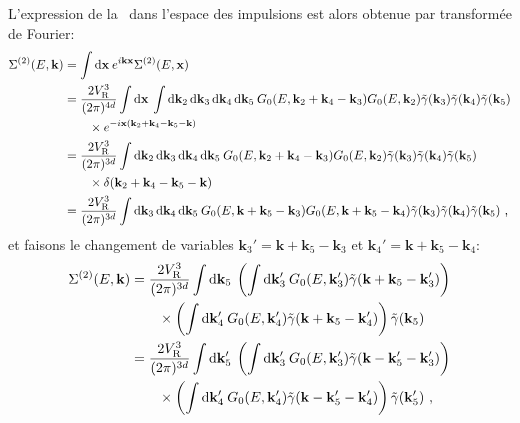 L'expression de la \selfenergy\ dans l'espace des impulsions est alors obtenue par transformée de Fourier: 
\begin{align}
\Sigma^{(2)}(E,\mathbf{k})&=\int{\mathop{}\mathopen{}\mathrm{d}\mathbf{x} \: e^{i \mathbf{k}\mathbf{x}} \Sigma^{(2)}(E,\mathbf{x})} \\
&=\nonumber \frac{2V_{\mathrm{R}}^3}{(2\pi)^{4d}} \int{\mathop{}\mathopen{}\mathrm{d}\mathbf{x} \: \int{\mathop{}\mathopen{}\mathrm{d}\mathbf{k}_{\mathrm{2}}\mathop{}\mathopen{}\mathrm{d}\mathbf{k}_{\mathrm{3}}\mathop{}\mathopen{}\mathrm{d}\mathbf{k}_{\mathrm{4}}\mathop{}\mathopen{}\mathrm{d}\mathbf{k}_{\mathrm{5}}\: G_0(E,\mathbf{k}_{\mathrm{2}}+\mathbf{k}_{\mathrm{4}}-\mathbf{k}_{\mathrm{3}}) G_0(E,\mathbf{k}_{\mathrm{2}})\tilde{\gamma}(\mathbf{k}_{\mathrm{3}})\tilde{\gamma}(\mathbf{k}_{\mathrm{4}})\tilde{\gamma}(\mathbf{k}_{\mathrm{5}})}} \\
& \qquad \times e^{-i \mathbf{x} (\mathbf{k}_{\mathrm{2}} + \mathbf{k}_{\mathrm{4}} - \mathbf{k}_{\mathrm{5}} - \mathbf{k})} \\
&=\nonumber \frac{2V_{\mathrm{R}}^3}{(2\pi)^{3d}} \int{\mathop{}\mathopen{}\mathrm{d}\mathbf{k}_{\mathrm{2}}\mathop{}\mathopen{}\mathrm{d}\mathbf{k}_{\mathrm{3}}\mathop{}\mathopen{}\mathrm{d}\mathbf{k}_{\mathrm{4}}\mathop{}\mathopen{}\mathrm{d}\mathbf{k}_{\mathrm{5}}\: G_0(E,\mathbf{k}_{\mathrm{2}}+\mathbf{k}_{\mathrm{4}}-\mathbf{k}_{\mathrm{3}}) G_0(E,\mathbf{k}_{\mathrm{2}})\tilde{\gamma}(\mathbf{k}_{\mathrm{3}})\tilde{\gamma}(\mathbf{k}_{\mathrm{4}})\tilde{\gamma}(\mathbf{k}_{\mathrm{5}})}\\
& \qquad \times\delta(\mathbf{k}_{\mathrm{2}} + \mathbf{k}_{\mathrm{4}} - \mathbf{k}_{\mathrm{5}} - \mathbf{k}) \\
&= \frac{2V_{\mathrm{R}}^3}{(2\pi)^{3d}} \int{\mathop{}\mathopen{}\mathrm{d}\mathbf{k}_{\mathrm{3}} \mathop{}\mathopen{}\mathrm{d}\mathbf{k}_{\mathrm{4}}\mathop{}\mathopen{}\mathrm{d}\mathbf{k}_{\mathrm{5}} \: G_0(E,\mathbf{k}+\mathbf{k}_{\mathrm{5}}-\mathbf{k}_{\mathrm{3}}) G_0(E,\mathbf{k}+\mathbf{k}_{\mathrm{5}}-\mathbf{k}_{\mathrm{4}})\tilde{\gamma}(\mathbf{k}_{\mathrm{3}})\tilde{\gamma}(\mathbf{k}_{\mathrm{4}})\tilde{\gamma}(\mathbf{k}_{\mathrm{5}})} \text{ ,}
\end{align}
et faisons le changement de variables $\mathbf{k}_{\mathrm{3}}'=\mathbf{k}+\mathbf{k}_{\mathrm{5}}-\mathbf{k}_{\mathrm{3}}$ et $\mathbf{k}_{\mathrm{4}}'=\mathbf{k}+\mathbf{k}_{\mathrm{5}}-\mathbf{k}_{\mathrm{4}}$:
\begin{align}
\Sigma^{(2)}(E,\mathbf{k})&= \frac{2V_{\mathrm{R}}^3}{(2\pi)^{3d}} \int{\mathop{}\mathopen{}\mathrm{d}\mathbf{k}_{\mathrm{5}} \: \left( \int{\mathop{}\mathopen{}\mathrm{d}\mathbf{k}_{\mathrm{3}}'\: G_0(E,\mathbf{k}_{\mathrm{3}}')\tilde{\gamma}(\mathbf{k}+\mathbf{k}_{\mathrm{5}}-\mathbf{k}_{\mathrm{3}}')} \right)} \\
&\nonumber \qquad \times\left( \int{\mathop{}\mathopen{}\mathrm{d}\mathbf{k}_{\mathrm{4}}'\: G_0(E,\mathbf{k}_{\mathrm{4}}') \tilde{\gamma}(\mathbf{k}+\mathbf{k}_{\mathrm{5}}-\mathbf{k}_{\mathrm{4}}')}\right) \tilde{\gamma}(\mathbf{k}_{\mathrm{5}})  \\
&= \frac{2V_{\mathrm{R}}^3}{(2\pi)^{3d}} \int{\mathop{}\mathopen{}\mathrm{d}\mathbf{k}_{\mathrm{5}}' \: \left( \int{\mathop{}\mathopen{}\mathrm{d}\mathbf{k}_{\mathrm{3}}'\: G_0(E,\mathbf{k}_{\mathrm{3}}')\tilde{\gamma}(\mathbf{k}-\mathbf{k}_{\mathrm{5}}'-\mathbf{k}_{\mathrm{3}}')} \right)}\\
&\nonumber\qquad\times \left( \int{\mathop{}\mathopen{}\mathrm{d}\mathbf{k}_{\mathrm{4}}'\: G_0(E,\mathbf{k}_{\mathrm{4}}') \tilde{\gamma}(\mathbf{k}-\mathbf{k}_{\mathrm{5}}'-\mathbf{k}_{\mathrm{4}}')}\right) \tilde{\gamma}(\mathbf{k}_{\mathrm{5}}') \text{ ,}
\end{align}
